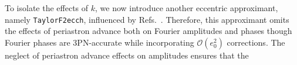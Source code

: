 \documentclass[aps,prd,twocolumn,superscriptaddress,groupedaddress,nofootinbib,showpacs,eqsecnum,useAms]{revtex4-2}
\begin{document}
To isolate the effects of $k$,
we now introduce another eccentric approximant, namely \texttt{TaylorF2ecch}, influenced by 
Refs.~\cite{THG,Yunes2009}. 
Therefore, this approximant omits the effects of periastron advance both on Fourier amplitudes and 
phases though Fourier phases are 3PN-accurate while incorporating $\mathcal{O}(e_0^2)$ corrections.
The neglect of periastron advance effects on amplitudes ensures that the 
\end{document}

